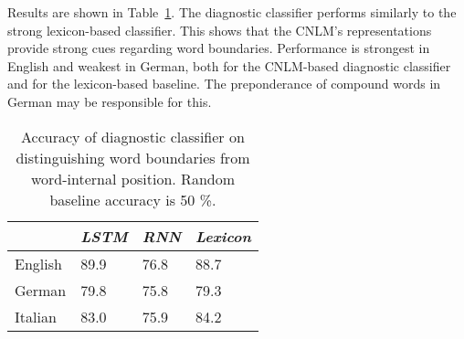 Results are shown in Table~\ref{tab:segmentation-results}.
The diagnostic classifier performs similarly to the strong lexicon-based classifier. %
This shows that the CNLM's representations provide strong cues regarding word boundaries.
Performance is strongest in English and weakest in German, both for the CNLM-based diagnostic classifier and for the lexicon-based baseline.
The preponderance of compound words in German may be responsible for this.



\begin{table}[t]
	\small
  \begin{center}
    \begin{tabular}{l|l|l|l}
      \multicolumn{1}{c|}{}&\emph{LSTM}&\emph{RNN}&\emph{Lexicon}\\
      \hline
      English & 89.9 &  76.8  &  88.7   \\ 
      German & 79.8  &  75.8 &  79.3  \\ 
      Italian &  83.0 &  75.9  &  84.2   \\ 
    \end{tabular}
  \end{center}
  \caption{\label{tab:segmentation-results} Accuracy of diagnostic classifier on distinguishing word boundaries from word-internal position. Random baseline accuracy is 50 \%.}
\end{table}




%



